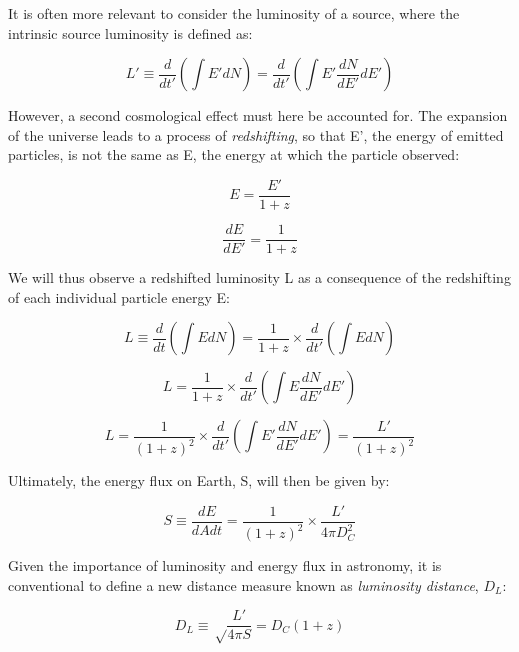 It is often more relevant to consider the luminosity of a source, where the intrinsic source luminosity is defined as:

\begin{equation}
L' \equiv \frac{d}{dt'} \left( \int E' dN \right) = \frac{d}{dt'} \left( \int E' \frac{dN}{dE'} dE' \right)
\end{equation}

However, a second cosmological effect must here be accounted for. The expansion of the universe leads to a process of \emph{redshifting}, so that E', the energy of emitted particles, is not the same as E, the energy at which the particle observed:

\begin{equation}
E = \frac{E'}{1+z}
\label{eq:redshift}
\end{equation}

\begin{equation}
\frac{dE}{dE'} = \frac{1}{1+z}
\label{eq:de}
\end{equation}

We will thus observe a redshifted luminosity L as a consequence of the redshifting of each individual particle energy E:

\begin{equation}
L \equiv \frac{d}{dt} \left( \int E dN \right) = \frac{1}{1+z} \times \frac{d}{dt'} \left( \int E dN \right)
\end{equation}

\begin{equation}
L = \frac{1}{1+z} \times \frac{d}{dt'} \left( \int E \frac{dN}{dE'} dE' \right)
\end{equation}

\begin{equation}
L = \frac{1}{(1+z)^{2}} \times \frac{d}{dt'} \left( \int E' \frac{dN}{dE'} dE' \right) = \frac{L'}{(1+z)^{2}}
\end{equation}

Ultimately, the energy flux on Earth, S, will then be given by:

\begin{equation}
S \equiv \frac{dE}{dAdt} =  \frac{1}{(1+z)^{2}} \times \frac{L'}{4 \pi D_{C}^{2}}
\label{eq:energy_flux}
\end{equation}

Given the importance of luminosity and energy flux in astronomy, it is conventional to define a new distance measure known as \emph{luminosity distance}, $D_{L}$:

\begin{equation}
D_{L} \equiv \sqrt\frac{L'}{4 \pi S} = D_{C}(1+z)
\end{equation}


